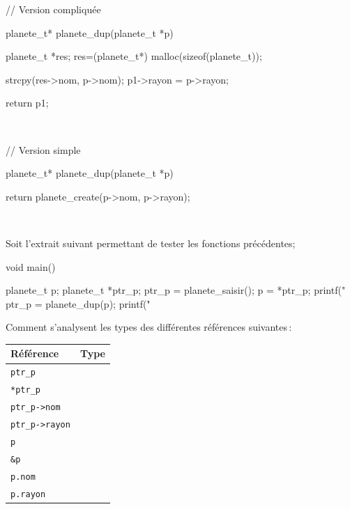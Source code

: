 \documentclass[10pt]{article}\usepackage[nu,correction]{esial}
\begin{document}
\begin{Reponse}
  \noindent
  \begin{boxedverbatim} 
// Version compliquée

planete_t* planete_dup(planete_t *p){

  planete_t *res;
  res=(planete_t*)
      malloc(sizeof(planete_t));
  
  strcpy(res->nom, p->nom);
  p1->rayon = p->rayon;
  
  return p1;
} \end{boxedverbatim}
~~~
  \begin{boxedverbatim} 
// Version simple

planete_t* planete_dup(planete_t *p){

  return planete_create(p->nom, 
                        p->rayon);
} 






\end{boxedverbatim}
~
\end{Reponse}

\Question  Soit l'extrait suivant permettant de tester les fonctions
précédentes;


\medskip


\begin{boxedverbatim}
void main() {

  planete_t p;
  planete_t *ptr_p;
  ptr_p = planete_saisir();
  p = *ptr_p;
  printf("%
  ptr_p = planete_dup(p);
  printf("%
}
\end{boxedverbatim}


\bigskip Comment s'analysent les types des différentes références
suivantes\,:

\bigskip

\begin{tabular}{|p{.2\linewidth}|p{.3\linewidth}|}
  \hline
  Référence          &   Type  \\\hline
  \verb+ptr_p+       &         \\\hline                  
  \verb+*ptr_p+      &         \\\hline            
  \verb+ptr_p->nom+  &         \\\hline
  \verb+ptr_p->rayon+&         \\\hline
  \verb+p+           &         \\\hline
  \verb+&p+          &         \\\hline
  \verb+p.nom+       &         \\\hline
  \verb+p.rayon+     &         \\\hline
\end{tabular}
\end{document}
